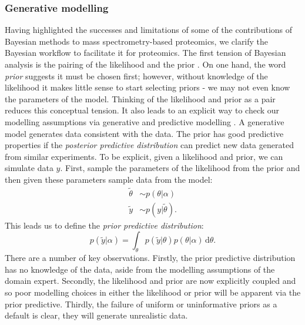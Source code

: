 \documentclass[12pt,english, journal=jpr, layout=twocolumn]{article}
\begin{document}
\subsubsection{Generative modelling}
Having highlighted the successes and limitations of some of the contributions of Bayesian methods to mass spectrometry-based proteomics, we clarify the Bayesian workflow to facilitate it for proteomics. The first tension of Bayesian analysis is the pairing of the likelihood and the prior \citep{Gelman::2017, Gelman::2020, Betancourt::2021}. On one hand, the word \textit{prior} suggests it must be chosen first; however, without knowledge of the likelihood it makes little sense to start selecting priors - we  may not even know the parameters of the model. Thinking of the likelihood and prior as a pair reduces this conceptual tension. It also leads to an explicit way to check our modelling assumptions via generative and predictive modelling \citep{Betancourt::2021}. A generative model generates data consistent with the data. The prior has good predictive properties if the \textit{posterior predictive distribution} can predict new data generated from similar experiments. To be explicit, given a likelihood and prior, we can simulate data $y$. First, sample the parameters of the likelihood from the prior and then given these parameters sample data from the model:	
\begin{equation}
\begin{split}
\tilde{\theta} &\sim p(\theta|\alpha) \\
\tilde{y} & \sim p(y|\tilde{\theta}).
\end{split}
\end{equation}
This leads us to define the \textit{prior predictive distribution}:
\begin{equation}
p(\tilde{y}|\alpha) = \int_{\theta} p(\tilde{y}|\theta)p(\theta|\alpha)\, \text{d}\theta.
\end{equation}
There are a number of key observations. Firstly, the prior predictive distribution has no knowledge of the data, aside from the modelling assumptions of the domain expert. Secondly, the likelihood and prior are now explicitly coupled and so poor modelling choices in either the likelihood or prior will be apparent via the prior predictive. Thirdly, the failure of uniform or uninformative priors as a default is clear, they will generate unrealistic data.
\end{document}

